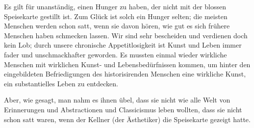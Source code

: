 Es gilt für unanständig, einen Hunger zu haben, der nicht mit der blossen Speisekarte gestillt ist. Zum Glück ist solch ein Hunger selten; die meisten Menschen werden schon satt, wenn sie davon hören, wie gut es sich frühere Menschen haben schmecken lassen. Wir sind sehr bescheiden und verdienen doch kein Lob; durch unsere chronische Appetitlosigkeit ist Kunst und Leben immer fader und unschmackhafter geworden. Es mussten einmal wieder wirkliche Menschen mit wirklichen Kunst- und Lebensbedürfnissen kommen, um hinter den eingebildeten Befriedigungen des historisirenden Menschen eine wirkliche Kunst, ein substantielles Leben zu entdecken.
\par

Aber, wie gesagt, man nahm es ihnen übel, dass sie nicht wie alle Welt von Erinnerungen und Abstractionen und Classicismus leben wollten, dass sie nicht schon satt waren, wenn der Kellner (der Ästhetiker) die Speisekarte gezeigt hatte.
\par

